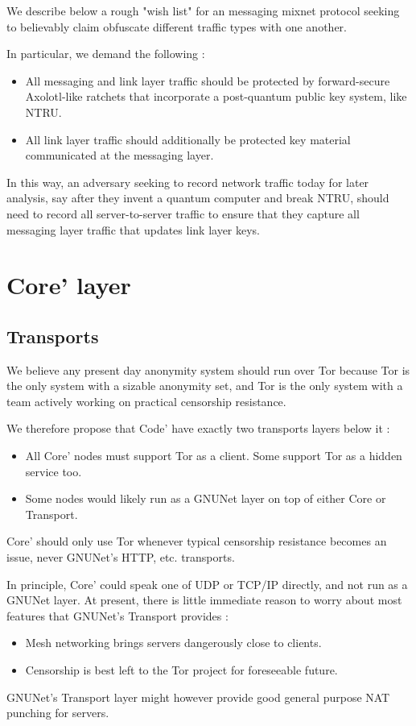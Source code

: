 We describe below a rough "wish list" for an messaging mixnet protocol
seeking to believably claim obfuscate different traffic types with one
another.

In particular, we demand the following :
\begin{itemize}
\item All messaging and link layer traffic should be protected by
forward-secure Axolotl-like ratchets that incorporate a post-quantum
public key system, like NTRU. 
\item All link layer traffic should additionally be protected key
material communicated at the messaging layer.
\end{itemize}
In this way, an adversary seeking to record network traffic today for
later analysis, say after they invent a quantum computer and break NTRU,
should need to record all server-to-server traffic to ensure that they
capture all messaging layer traffic that updates link layer keys.


\section{Core' layer}

\subsection{Transports}

We believe any present day anonymity system should run over Tor because
Tor is the only system with a sizable anonymity set, and Tor is the only
system with a team actively working on practical censorship resistance.

We therefore propose that Code' have exactly two transports layers below
it :
\begin{itemize}
\item All Core' nodes must support Tor as a client.  Some support Tor as
a hidden service too.
\item Some nodes would likely run as a GNUNet layer on top of either
Core or Transport.  
\end{itemize}

Core' should only use Tor whenever typical censorship resistance becomes
an issue, never GNUNet's HTTP, etc. transports.  

In principle, Core' could speak one of UDP or TCP/IP directly, and not
run as a GNUNet layer.  At present, there is little immediate reason to
worry about most features that GNUNet's Transport provides :
\begin{itemize}
\item Mesh networking brings servers dangerously close to clients. 
\item Censorship is best left to the Tor project for foreseeable
future. 
\end{itemize}
GNUNet's Transport layer might however provide good general purpose NAT
punching for servers. 


